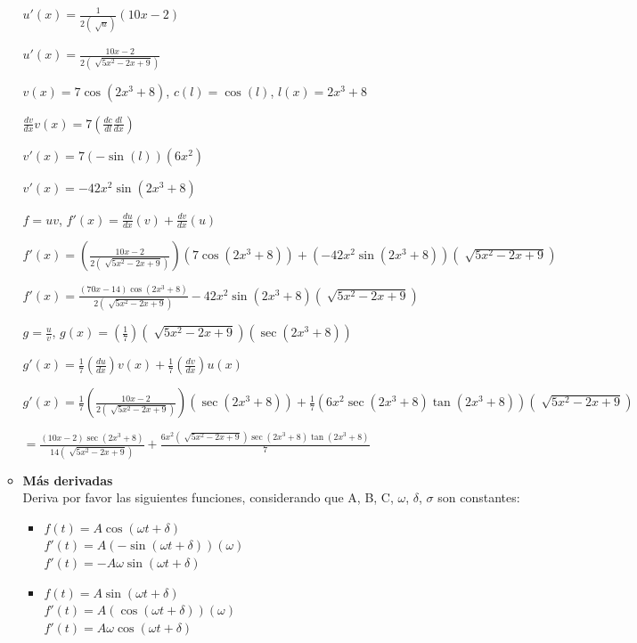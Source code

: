 \documentclass[10pt, a4paper]{article}
\begin{document}
\begin{enumerate}
\begin{itemize}
\begin{center}
                    $u'(x)=\frac{1}{2(\sqrt[]{a})}(10x-2)$

                    $u'(x)=\frac{10x-2}{2(\sqrt[]{5x^2-2x+9})}$

                    $v(x) = 7\cos(2x^3 + 8)$, $c(l)=\cos(l)$, $l(x)=2x^3 + 8$

                    $\frac{dv}{dx}v(x)=7(\frac{dc}{dl}\frac{dl}{dx})$

                    $v'(x)=7(-\sin(l))(6x^2)$

                    $v'(x)=-42x^2\sin(2x^3 + 8)$

                    $f = uv$, $f'(x)= \frac{du}{dx}(v) + \frac{dv}{dx}(u)$

                    $f'(x)=(\frac{10x-2}{2(\sqrt[]{5x^2-2x+9})})(7\cos(2x^3 + 8))+(-42x^2\sin(2x^3 + 8))(\sqrt[]{5x^2-2x+9})$

                    $f'(x)=\frac{(70x-14)\cos(2x^3 + 8)}{2(\sqrt[]{5x^2-2x+9})}-42x^2\sin(2x^3 + 8)(\sqrt[]{5x^2-2x+9})$

                    $g=\frac{u}{v}$, $g(x)=(\frac{1}{7})(\sqrt[]{5x^2-2x+9})(\sec(2x^3 + 8))$

                    $g'(x)=\frac{1}{7}(\frac{du}{dx})v(x)+\frac{1}{7}(\frac{dv}{dx})u(x)$

                    $g'(x)=\frac{1}{7}(\frac{10x-2}{2(\sqrt[]{5x^2-2x+9})})(\sec(2x^3 + 8))+\frac{1}{7}(6x^2\sec(2x^3 + 8)\tan(2x^3 + 8))(\sqrt[]{5x^2-2x+9})$

                    $=\frac{(10x-2)\sec(2x^3 + 8)}{14(\sqrt[]{5x^2-2x+9})}+\frac{6x^2(\sqrt[]{5x^2-2x+9})\sec(2x^3 + 8)\tan(2x^3 + 8)}{7}$
                    
                \end{center}

                \item \textbf{Más derivadas} \\
                Deriva por favor las siguientes funciones, considerando que
                A, B, C, $\omega$, $\delta$, $\sigma$ son constantes:

                \begin{itemize}
                    \item$f(t) = A\cos(\omega t + \delta)$\\
                    $f'(t)=A(-\sin(\omega t + \delta))(\omega)$\\
                    $f'(t)=-A\omega \sin(\omega t + \delta)$

                    \item$f(t) = A\sin(\omega t + \delta)$\\
                    $f'(t)=A(\cos(\omega t + \delta))(\omega)$\\
                    $f'(t)=A\omega \cos(\omega t + \delta)$


\end{itemize}
\end{itemize}
\end{enumerate}
\end{document}
